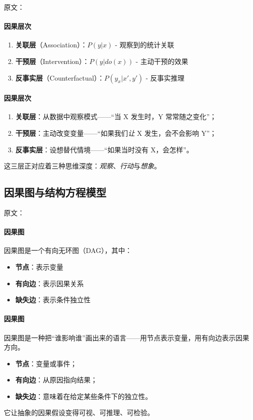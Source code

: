原文：
\paragraph{因果层次}
\begin{enumerate}
\item \textbf{关联层}（Association）：$P(y|x)$ - 观察到的统计关联
\item \textbf{干预层}（Intervention）：$P(y|do(x))$ - 主动干预的效果
\item \textbf{反事实层}（Counterfactual）：$P(y_x|x', y')$ - 反事实推理
\end{enumerate}
\paragraph{因果层次}
\begin{enumerate}
\item \textbf{关联层}：从数据中观察模式——“当 X 发生时，Y 常常随之变化”；  
\item \textbf{干预层}：主动改变变量——“如果我们\emph{让} X 发生，会不会影响 Y”；  
\item \textbf{反事实层}：设想替代情境——“如果当时没有 X，会怎样”。  
\end{enumerate}
这三层正对应着三种思维深度：\emph{观察}、\emph{行动}与\emph{想象}。

\subsection{因果图与结构方程模型}

原文：
\paragraph{因果图}
因果图是一个有向无环图（DAG），其中：
\begin{itemize}
\item \textbf{节点}：表示变量
\item \textbf{有向边}：表示因果关系
\item \textbf{缺失边}：表示条件独立性
\end{itemize}
\paragraph{因果图}
因果图是一种把“谁影响谁”画出来的语言——用节点表示变量，用有向边表示因果方向。  
\begin{itemize}
\item \textbf{节点}：变量或事件；  
\item \textbf{有向边}：从原因指向结果；  
\item \textbf{缺失边}：意味着在给定某些条件下的独立性。  
\end{itemize}
它让抽象的因果假设变得可视、可推理、可检验。

